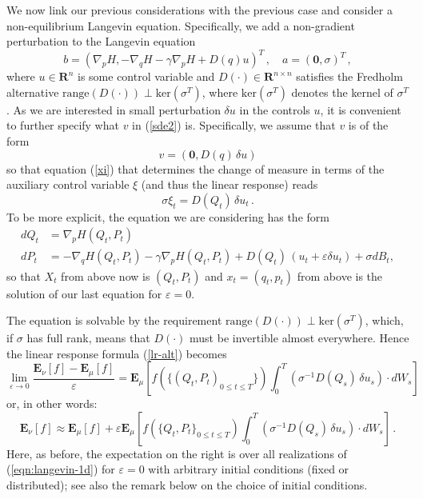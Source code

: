 \documentclass[aip,jcp,a4paper,reprint,onecolumn]{revtex4-1}
\newcommand{\R}{{\mathbf R}}
\newcommand{\eps}{\varepsilon}
\newcommand{\bE}{{\mathbf E}}
\newcommand{\zero}{{\mathbf 0}}
\begin{document}
We now link our previous considerations with the previous case and consider a non-equilibrium Langevin equation. Specifically, we add a non-gradient perturbation to the Langevin equation 
\begin{equation}\label{eqn:langevin-1b}
b = \left(\nabla_{p}H, -\nabla_{q} H - \gamma\nabla_{p}H  + D(q) u \right)^{T}\,,\quad a= (\zero,\sigma)^{T}\,,
\end{equation}
where $u\in\R^{n}$ is some control variable and $D(\cdot)\in\R^{n\times n}$ satisfies the Fredholm alternative $\mathrm{range}(D(\cdot))\perp \mathrm{ker}(\sigma^{T})$, where $\mathrm{ker}(\sigma^T)$ denotes the kernel of $\sigma^T$. As we are interested in small perturbation $\delta u$ in the controls $u$, it is convenient to further specify what $v$ in (\ref{sde2}) is. Specifically, we assume that $v$ is of the form 
\begin{equation}\label{eqn:langevin-1c}
v = (\zero, D(q)\,\delta u)
\end{equation}
so that equation (\ref{xi}) that determines the change of measure in terms of the auxiliary control variable $\xi$ (and thus the linear response) reads 
\[
\sigma \xi_{t} = D(Q_{t})\,\delta u_{t}\,.
\]
To be more explicit, the equation we are considering has the form
\begin{equation}\label{eqn:langevin-1d}
\begin{aligned}
dQ_t & =  \nabla_p H(Q_t,P_t)\\
dP_t & =  -\nabla_q H(Q_t,P_t) - \gamma \nabla_p H(Q_t,P_t) + D(Q_t)\,(u_t+\eps \delta u_t)+\sigma dB_t,
\end{aligned}
\end{equation}
so that $X_t$ from above now is $(Q_t,P_t)$ and $x_t=(q_t,p_t)$ from above is the solution of our last equation for $\eps=0$.

The equation is solvable by the requirement  $\mathrm{range}(D(\cdot))\perp \mathrm{ker}(\sigma^{T})$, which, if $\sigma$ has full rank, means that $D(\cdot)$ must be invertible almost everywhere. Hence the linear response formula (\ref{lr-alt})  becomes
\begin{equation}\label{lr-alt2}
\lim_{\eps\to 0}\frac{\bE_{\nu}[f] - \bE_{\mu}[f]}{\eps} =  \bE_{\mu}\left[f(\{(Q_{t},P_{t})_{0\le t\le T}\})\int_{0}^{T}(\sigma^{-1}D(Q_{s})\,\delta u_{s})\cdot dW_{s} \right]\,
\end{equation}
or, in other words: 
\begin{equation}\label{eqn:neq-response}
\bE_{\nu}[f] \approx \bE_{\mu}[f] + \eps\bE_{\mu}\left[f(\{Q_{t},P_{t}\}_{0\le t\le T})\int_{0}^{T}(\sigma^{-1}D(Q_{s})\,\delta u_{s})\cdot dW_{s} \right]\,.
\end{equation}
Here, as before, the expectation on the right is over all realizations of (\ref{eqn:langevin-1d}) for $\eps=0$ with arbitrary initial conditions (fixed or distributed); see also the remark below on the choice of initial conditions. 
\end{document}
